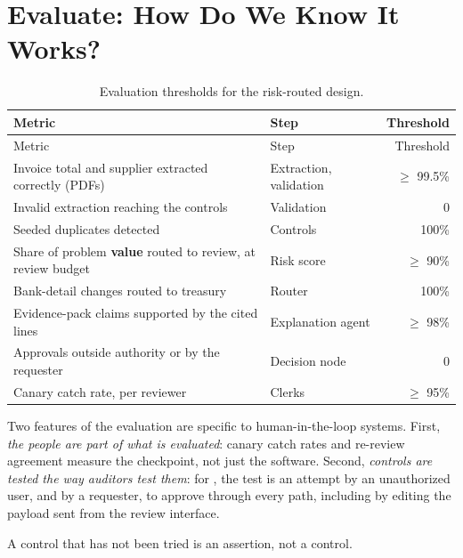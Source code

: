 \section{Evaluate: How Do We Know It Works?}
\label{sec:inv-evaluate}

\begingroup
\small
\begin{xltabular}{\textwidth}{@{}>{\raggedright\arraybackslash}X>{\raggedright\arraybackslash}p{3.0cm}r@{}}
\caption{Evaluation thresholds for the risk-routed design.}\label{tab:inv-thresholds}\\
\toprule
{} Metric & Step & Threshold \\
\midrule
\endfirsthead
\toprule
{} Metric & Step & Threshold \\
\midrule
\endhead
Invoice total and supplier extracted correctly (PDFs) & Extraction, validation & $\ge$ 99.5\% \\
Invalid extraction reaching the controls & Validation & 0 \\
Seeded duplicates detected & Controls & 100\% \\
Share of problem \textbf{value} routed to review, at review budget & Risk score & $\ge$ 90\% \\
Bank-detail changes routed to treasury & Router & 100\% \\
Evidence-pack claims supported by the cited lines & Explanation agent & $\ge$ 98\% \\
Approvals outside authority or by the requester & Decision node & 0 \\
Canary catch rate, per reviewer & Clerks & $\ge$ 95\% \\
\bottomrule
\end{xltabular}
\endgroup

Two features of the evaluation are specific to human-in-the-loop systems. First, \emph{the people are part of what is evaluated}: canary catch rates and re-review agreement measure the checkpoint, not just the software. Second, \emph{controls are tested the way auditors test them}: for , the test is an attempt by an unauthorized user, and by a requester, to approve through every path, including by editing the payload sent from the review interface.

\begin{keyidea}
A control that has not been tried is an assertion, not a control.
\end{keyidea}

